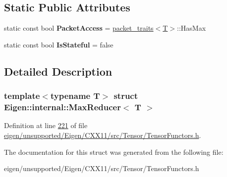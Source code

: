 \subsection*{Static Public Attributes}
\begin{DoxyCompactItemize}
\item 
\mbox{\label{struct_eigen_1_1internal_1_1_max_reducer_a25111721c6b0b623f9c10ef11deb4fc1}} 
static const bool {\bfseries Packet\+Access} = \hyperlink{struct_eigen_1_1internal_1_1packet__traits}{packet\+\_\+traits}$<$\hyperlink{group___sparse_core___module}{T}$>$\+::Has\+Max
\item 
\mbox{\label{struct_eigen_1_1internal_1_1_max_reducer_a2861e8011acbb9e31db373d3f8bdd2a1}} 
static const bool {\bfseries Is\+Stateful} = false
\end{DoxyCompactItemize}


\subsection{Detailed Description}
\subsubsection*{template$<$typename T$>$\newline
struct Eigen\+::internal\+::\+Max\+Reducer$<$ T $>$}



Definition at line \hyperlink{eigen_2unsupported_2_eigen_2_c_x_x11_2src_2_tensor_2_tensor_functors_8h_source_l00221}{221} of file \hyperlink{eigen_2unsupported_2_eigen_2_c_x_x11_2src_2_tensor_2_tensor_functors_8h_source}{eigen/unsupported/\+Eigen/\+C\+X\+X11/src/\+Tensor/\+Tensor\+Functors.\+h}.



The documentation for this struct was generated from the following file\+:\begin{DoxyCompactItemize}
\item 
eigen/unsupported/\+Eigen/\+C\+X\+X11/src/\+Tensor/\+Tensor\+Functors.\+h\end{DoxyCompactItemize}
